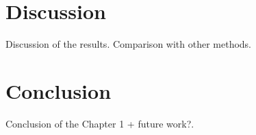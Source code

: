 
\clearpage
\section{Discussion\label{sec:Discussion}}
Discussion of the results. Comparison with other methods. 

\clearpage
\section{Conclusion\label{sec:Conclusion}}
Conclusion of the Chapter 1 + future work?.